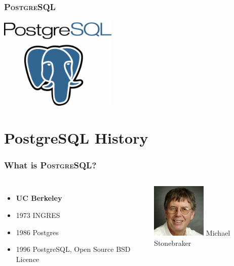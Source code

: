 \documentclass{beamer}
\begin{document}
\begin{frame}
  \frametitle{\textsc{PostgreSQL}}

  \begin{center}
    \includegraphics[height=12em]{postgres-logo.png}
  \end{center}
\end{frame}

\section{PostgreSQL History}

\begin{frame}[fragile]
  \frametitle{What is \textsc{PostgreSQL}?}

  \vfill

\begin{columns}[c]

  \begin{itemize}
  \item \textbf{UC Berkeley}
  \item 1973 INGRES
  \item 1986 Postgres
  \item 1996 PostgreSQL, Open Source BSD Licence
  \end{itemize}

\begin{center}
  \includegraphics[height=7em]{021909_Stonebraker_Michael_250_large.jpg}
  \linebreak
  Michael Stonebraker
\end{center}
\end{columns}
\end{frame}
\end{document}
